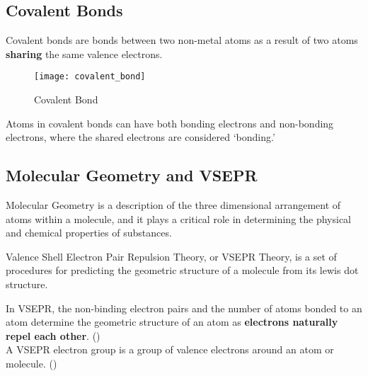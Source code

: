 \subsection{Covalent Bonds}

\begin{defn}
Covalent bonds are bonds between two non-metal atoms as a result of two atoms \textbf{sharing} the same valence electrons.
\end{defn}

\begin{figure}[H]
	\centering
	\texttt{[image: covalent\_bond]}
	\caption{Covalent Bond}
\end{figure}

\noindent
Atoms in covalent bonds can have both bonding electrons and non-bonding electrons, where the shared electrons are considered `bonding.' \\

\noindent
{}

\subsection{Molecular Geometry and VSEPR}

\begin{defn}
Molecular Geometry is a description of the three dimensional arrangement of atoms within a molecule, and it plays a critical role in determining the physical and chemical properties of substances.
\end{defn}

\begin{defn}
Valence Shell Electron Pair Repulsion Theory, or VSEPR Theory, is a set of procedures for predicting the geometric structure of a molecule from its lewis dot structure.
\end{defn}

\noindent
In VSEPR, the non-binding electron pairs and the number of atoms bonded to an atom determine the geometric structure of an atom as \textbf{electrons naturally repel each other}. () \\

\noindent
A VSEPR electron group is a group of valence electrons around an atom or molecule. ()

